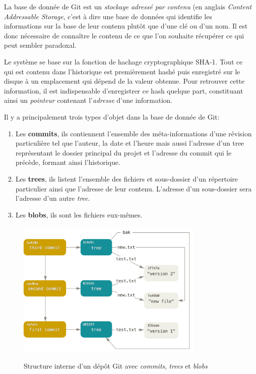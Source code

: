\documentclass[11pt,a4paper]{article}
\begin{document}
La base de donnée de Git est un \textit{stockage adressé par contenu} (en anglais \textit{Content Addressable Storage}, c'est à dire une base de données qui identifie les informations sur la base de leur contenu plutôt que d'une clé ou d'un nom.
Il est donc nécessaire de connaître le contenu de ce que l'on souhaite récupérer ce qui peut sembler paradoxal.

Le système se base sur la fonction de hachage cryptographique SHA-1.
Tout ce qui est contenu dans l'historique est premièrement hashé puis enregistré sur le disque à un emplacement qui dépend de la valeur obtenue.
Pour retrouver cette information, il est indispensable d'enregistrer ce hash quelque part, constituant ainsi un \textit{pointeur} contenant l'\textit{adresse} d'une information.

Il y a principalement trois types d'objet dans la base de donnée de Git:

\begin{enumerate}
	\item Les {\bf commits},
	ils contiennent l'ensemble des méta-informations d'une révision particulière tel que l'auteur, la date et l'heure mais aussi l'adresse d'un tree représentant le dossier principal du projet et l'adresse du commit qui le précède, formant ainsi l'historique.
	
	\item Les {\bf trees},
	ils listent l'ensemble des fichiers et sous-dossier d'un répertoire particulier ainsi que l'adresse de leur contenu.
	L'adresse d'un sous-dossier sera l'adresse d'un autre \textit{tree}.
	
	\item Les {\bf blobs},
	ils sont les fichiers eux-mêmes.
\end{enumerate}

\begin{figure}[H]
\begin{center}
\includegraphics[width=9.1cm]{img_structure} \cite{progit}
\caption{Structure interne d'un dépôt Git avec \textit{commits}, \textit{trees} et \textit{blobs}}
\end{center}
\end{figure}
\end{document}

